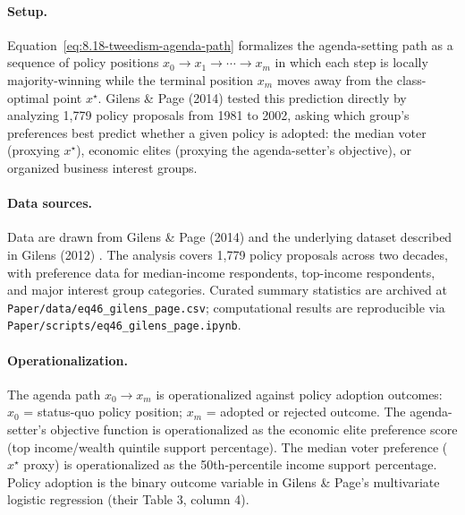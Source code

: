 \paragraph{Setup.}
Equation~\ref{eq:8.18-tweedism-agenda-path} formalizes the agenda-setting path as a sequence of policy positions $x_0 \rightarrow x_1 \rightarrow \cdots \rightarrow x_m$ in which each step is locally majority-winning while the terminal position $x_m$ moves away from the class-optimal point $x^\star$. Gilens \& Page (2014) tested this prediction directly by analyzing 1,779 policy proposals from 1981 to 2002, asking which group's preferences best predict whether a given policy is adopted: the median voter (proxying $x^\star$), economic elites (proxying the agenda-setter's objective), or organized business interest groups.

\paragraph{Data sources.}
Data are drawn from Gilens \& Page (2014) \cite{gilens} and the underlying dataset described in Gilens (2012) \cite{gilens_book}. The analysis covers 1,779 policy proposals across two decades, with preference data for median-income respondents, top-income respondents, and major interest group categories. Curated summary statistics are archived at \texttt{Paper/data/eq46\_gilens\_page.csv}; computational results are reproducible via \texttt{Paper/scripts/eq46\_gilens\_page.ipynb}.

\paragraph{Operationalization.}
The agenda path $x_0 \rightarrow x_m$ is operationalized against policy adoption outcomes: $x_0$ = status-quo policy position; $x_m$ = adopted or rejected outcome. The agenda-setter's objective function is operationalized as the economic elite preference score (top income/wealth quintile support percentage). The median voter preference ($x^\star$ proxy) is operationalized as the 50th-percentile income support percentage. Policy adoption is the binary outcome variable in Gilens \& Page's multivariate logistic regression (their Table 3, column 4).

